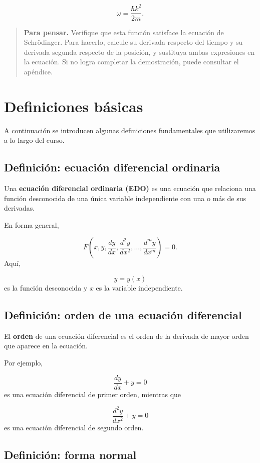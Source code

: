 \documentclass[12pt,a4paper]{article}
\begin{document}
	\[
	\omega=\frac{\hbar k^2}{2m}.
	\]
	\begin{quote}
		\textbf{Para pensar.} Verifique que esta función satisface la ecuación de Schrödinger. Para hacerlo, calcule su derivada respecto del tiempo y su derivada segunda respecto de la posición, y sustituya ambas expresiones en la ecuación. Si no logra completar la demostración, puede consultar el apéndice.
	\end{quote}
	
	\clearpage
	\section{Definiciones básicas}
	
	A continuación se introducen algunas definiciones fundamentales que utilizaremos a lo largo del curso.
	
	\subsection{Definición: ecuación diferencial ordinaria}
	
	Una \textbf{ecuación diferencial ordinaria (EDO)} es una ecuación que relaciona una función desconocida de una única variable independiente con una o más de sus derivadas.
	
	En forma general,
	
	\[
	F\left(
	x,
	y,
	\frac{dy}{dx},
	\frac{d^2y}{dx^2},
	\dots,
	\frac{d^m y}{dx^m}
	\right)
	=
	0.
	\]
	Aquí,
	
	\[
	y=y(x)
	\]
	es la función desconocida y \(x\) es la variable independiente.
	
	\subsection{Definición: orden de una ecuación diferencial}
	
	El \textbf{orden} de una ecuación diferencial es el orden de la derivada de mayor orden que aparece en la ecuación.
	
	Por ejemplo,
	
	\[
	\frac{dy}{dx}+y=0
	\]
	es una ecuación diferencial de primer orden, mientras que
	
	\[
	\frac{d^2y}{dx^2}+y=0
	\]
	es una ecuación diferencial de segundo orden.
	
	\subsection{Definición: forma normal}
	
\end{document}
